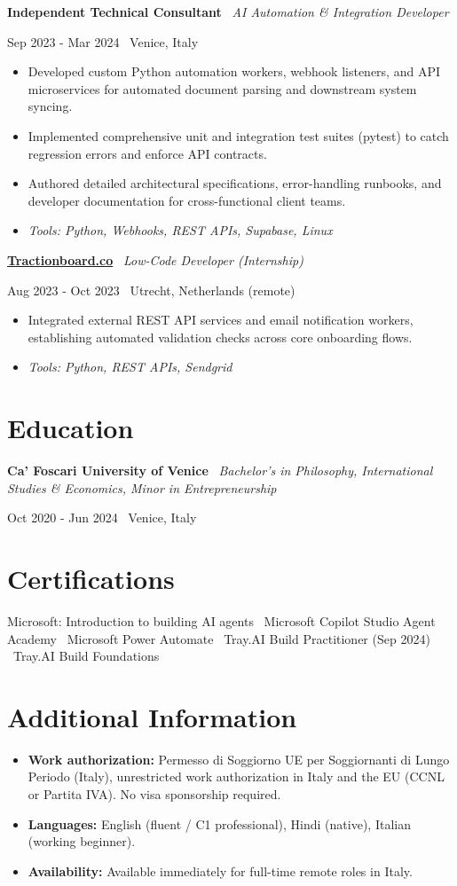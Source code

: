 \documentclass[a4paper,10pt]{article}
\newcommand{\role}[4]{%
 \vspace{2pt}\noindent
 \begin{minipage}[t]{0.70\textwidth}\raggedright\textbf{#1} \textbullet\ \textit{#3}\end{minipage}%
 \hfill
 \begin{minipage}[t]{0.28\textwidth}\raggedleft\footnotesize\color{gray}#2 \textbullet\ #4\end{minipage}%
 \vspace{1pt}%
}
\begin{document}
\role{Independent Technical Consultant}{Sep 2023 - Mar 2024}{AI Automation \& Integration Developer}{Venice, Italy}
\begin{itemize}
 \item Developed custom Python automation workers, webhook listeners, and API microservices for automated document parsing and downstream system syncing.
 \item Implemented comprehensive unit and integration test suites (pytest) to catch regression errors and enforce API contracts.
 \item Authored detailed architectural specifications, error-handling runbooks, and developer documentation for cross-functional client teams.
 \item \textit{Tools: Python, Webhooks, REST APIs, Supabase, Linux}
\end{itemize}

\role{\href{https://tractionboard.co}{Tractionboard.co}}{Aug 2023 - Oct 2023}{Low-Code Developer (Internship)}{Utrecht, Netherlands (remote)}
\begin{itemize}
 \item Integrated external REST API services and email notification workers, establishing automated validation checks across core onboarding flows.
 \item \textit{Tools: Python, REST APIs, Sendgrid}
\end{itemize}

\section{Education}
\role{Ca' Foscari University of Venice}{Oct 2020 - Jun 2024}{Bachelor's in Philosophy, International Studies \& Economics, Minor in Entrepreneurship}{Venice, Italy}

\section{Certifications}
Microsoft: Introduction to building AI agents \textbullet\ Microsoft Copilot Studio Agent Academy \textbullet\ Microsoft Power Automate \textbullet\ Tray.AI Build Practitioner (Sep 2024) \textbullet\ Tray.AI Build Foundations

\section{Additional Information}
\begin{itemize}
 \item \textbf{Work authorization:} Permesso di Soggiorno UE per Soggiornanti di Lungo Periodo (Italy), unrestricted work authorization in Italy and the EU (CCNL or Partita IVA). No visa sponsorship required.
 \item \textbf{Languages:} English (fluent / C1 professional), Hindi (native), Italian (working beginner).
 \item \textbf{Availability:} Available immediately for full-time remote roles in Italy.
\end{itemize}
\end{document}
